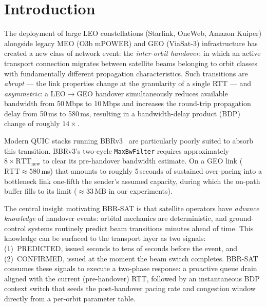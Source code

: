 \documentclass[conference]{IEEEtran}
\begin{document}
\section{Introduction}
\label{sec:intro}

The deployment of large LEO constellations (Starlink, OneWeb, Amazon Kuiper)
alongside legacy MEO (O3b mPOWER) and GEO (ViaSat-3) infrastructure has
created a new class of network event: the \emph{inter-orbit handover}, in
which an active transport connection migrates between satellite beams
belonging to orbit classes with fundamentally different propagation
characteristics.
Such transitions are \emph{abrupt} --- the link properties change at the
granularity of a single RTT --- and \emph{asymmetric}:
a LEO$\to$GEO handover simultaneously reduces available bandwidth from
50\,Mbps to 10\,Mbps and increases the round-trip propagation delay from
50\,ms to 580\,ms, resulting in a bandwidth-delay product (BDP) change of
roughly $14\times$.

Modern QUIC stacks running BBRv3~\cite{cardwell2017} are particularly
poorly suited to absorb this transition.
BBRv3's two-cycle \texttt{MaxBwFilter} requires approximately
$8 \times \mathrm{RTT}_\mathrm{new}$ to clear its pre-handover bandwidth
estimate.
On a GEO link ($\mathrm{RTT} \approx 580$\,ms) that amounts to roughly
5\,seconds of sustained over-pacing into a bottleneck link one-fifth the
sender's assumed capacity, during which the on-path buffer fills to its
limit (${\approx}33$\,MB in our experiments).

The central insight motivating BBR-SAT is that satellite operators have
\emph{advance knowledge} of handover events: orbital mechanics are
deterministic, and ground-control systems routinely predict beam transitions
minutes ahead of time.
This knowledge can be surfaced to the transport layer as two signals:
(1)~PREDICTED, issued seconds to tens of seconds before the event, and
(2)~CONFIRMED, issued at the moment the beam switch completes.
BBR-SAT consumes these signals to execute a two-phase response:
a proactive queue drain aligned with the current (pre-handover) RTT,
followed by an instantaneous BDP context switch that seeds the post-handover
pacing rate and congestion window directly from a per-orbit parameter table.
\end{document}
